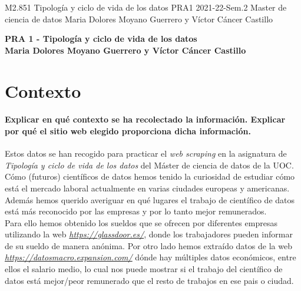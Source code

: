 \documentclass[IB]{PlantillaPACnova_Est}
\begin{document}
\textinicial
{M2.851} 				
{Tipología y ciclo de vida de los datos}
{PRA1}
{2021-22-Sem.2}
{Master de ciencia de datos}
{Maria Dolores Moyano Guerrero y Víctor Cáncer Castillo}




\begin{center}
\textbf{{\LARGE PRA 1 - Tipología y ciclo de vida de los datos}}\\[1cm]

\textbf{{\Large Maria Dolores Moyano Guerrero y Víctor Cáncer Castillo}}
\end{center}

\tableofcontents
\newpage 

\section{Contexto}
\paragraph{Explicar en qué contexto se ha recolectado la información. Explicar por qué el sitio web elegido proporciona dicha información.\\} 
Estos datos se han recogido para practicar el \textit{web scraping} en la asignatura de \textit{Tipología y ciclo de vida de los datos} del Máster de ciencia de datos de la UOC.\\
Cómo (futuros) científicos de datos hemos tenido la curiosidad de estudiar cómo está el mercado laboral actualmente en varias ciudades europeas y americanas. Además hemos querido averiguar en qué lugares el trabajo de científico de datos está más reconocido por las empresas y por lo tanto mejor remunerados. \\
Para ello hemos obtenido los sueldos que se ofrecen por diferentes empresas utilizando la web \textit{\url{https://glassdoor.es/}}, donde los trabajadores pueden informar de su sueldo de manera anónima. Por otro lado hemos extraído datos de la web \textit{ \url{https://datosmacro.expansion.com/}} dónde hay múltiples datos económicos, entre ellos el salario medio, lo cual nos puede mostrar si el trabajo del científico de datos está mejor/peor remunerado que el resto de trabajos en ese pais o ciudad.
\end{document}
